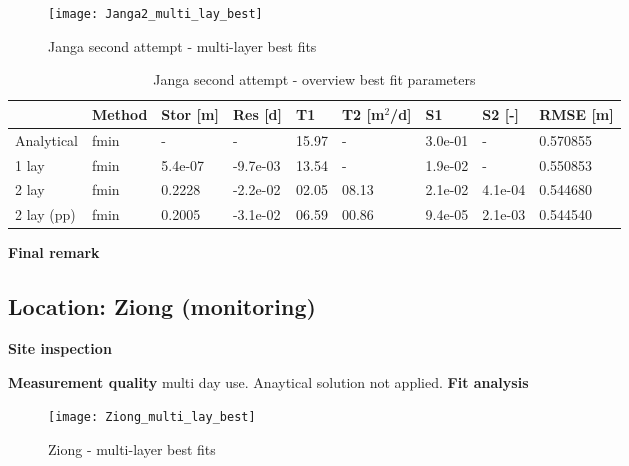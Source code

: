 \begin{figure}[h!]
 \centering
 \texttt{[image: Janga2\_multi\_lay\_best]}
 \captionsetup{justification=centering} 
 \caption{Janga second attempt - multi-layer best fits}
 \label{fig:Janga2_best}
\end{figure}

\begin{table}[h!]
\small
\centering
\caption{Janga second attempt - overview best fit parameters}
\label{tab:Janga2_table}
\begin{tabular}{l|l|l|l|ll|ll|l}
\hline 
\textbf{}       & \textbf{Method} & \textbf{Stor [m]} & \textbf{Res [d]} & \textbf{T1}  & \textbf{T2   [m$^2$/d]}  & \textbf{S1}  & \textbf{S2 [-]}  & \textbf{RMSE [m]} \\ \hline \hline
Analytical                & fmin             & -             & -            & 15.97      & -          & 3.0e-01    & -          & 0.570855 \\
1 lay                     & fmin             & 5.4e-07       & -9.7e-03     & 13.54      & -          & 1.9e-02    & -          & 0.550853 \\
2 lay                     & fmin             & 0.2228        & -2.2e-02     & 02.05      & 08.13      & 2.1e-02    & 4.1e-04    & 0.544680 \\
2 lay (pp)                & fmin             & 0.2005        & -3.1e-02     & 06.59      & 00.86      & 9.4e-05    & 2.1e-03    & 0.544540 \\ \hline    
\end{tabular}
\end{table}

\textbf{Final remark}

\subsection{Location: Ziong (monitoring)}


\textbf{Site inspection}

\textbf{Measurement quality}
multi day use. Anaytical solution not applied. 
\textbf{Fit analysis}

\begin{figure}[h!]
 \centering
 \texttt{[image: Ziong\_multi\_lay\_best]}
 \captionsetup{justification=centering} 
 \caption{Ziong - multi-layer best fits}
 \label{fig:Ziong_best}
\end{figure}

